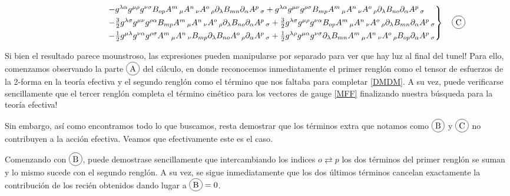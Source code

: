 \documentclass{article}
\numberwithin{equation}{section}
\newcommand*\circled[1]{\tikz[baseline=(char.base)]{ \node[shape=circle,draw,inner sep=2pt] (char) {#1};}} %
\newcommand\f[1]{\mathopen{\hphantom{#1}}} %
\begin{document}
\begin{equation}\label{Hcompact}
\begin{split}
\begin{rcases}
& \f{123456789123}- g^{\lambda \alpha} g^{\mu \rho} g^{\nu \sigma} B_{o p} 	A^{m}\,_{\mu} A^{n}\,_{\nu} A^{o}\,_{\rho} \partial_{\lambda}{B_{m n}} \partial_{\alpha}{A^{p}\,_{\sigma}} + g^{\lambda \alpha} g^{\mu \nu} g^{\rho \sigma} B_{m p} A^{m}\,_{\mu} A^{n}\,_{\nu}  A^{o}\,_{\rho} \partial_{\lambda}{B_{n o}} \partial_{\alpha}{A^{p}\,_{\sigma}} \\
& \f{123456789123} - \frac{3}{2} g^{\lambda \sigma} g^{\mu \nu} g^{\rho \alpha} B_{m p} A^{m}\,_{\mu} A^{n}\,_{\nu} A^{o}\,_{\rho} \partial_{\lambda}{B_{n o}} \partial_{\alpha}{A^{p}\,_{\sigma}} + \frac{3}{2}g^{\lambda \sigma} g^{\mu \rho} g^{\nu \alpha} B_{o p} A^{m}\,_{\mu} A^{n}\,_{\nu} A^{o}\,_{\rho} \partial_{\lambda}{B_{m n}} \partial_{\alpha}{A^{p}\,_{\sigma}}\\
& \f{123456789123} - \frac{1}{2}g^{\mu \lambda} g^{\nu \alpha} g^{\rho \sigma} A^{m}\,_{\mu} A^{n}\,_{\nu} B_{m p} \partial_{\lambda}{B_{n o}} A^{o}\,_{\rho} \partial_{\alpha}{A^{p}\,_{\sigma}} + \frac{1}{2}g^{\lambda \rho} g^{\mu \alpha} g^{\nu \sigma} \partial_{\lambda}{B_{m n}} A^{m}\,_{\mu} A^{n}\,_{\nu} A^{o}\,_{\rho} B_{o p} \partial_{\alpha}{A^{p}\,_{\sigma}}
\end{rcases}
\quad \circled{C}
\end{split}
\end{equation}


Si bien el resultado parece mounstroso, las expresiones pueden manipularse por separado para ver que hay luz al final del tunel! Para ello, comenzamos observando la parte $ \circled{A} $ del cálculo, en donde reconocemos inmediatamente el primer renglón como el tensor de esfuerzos de la 2-forma en la teoría efectiva y el segundo renglón como el término que nos faltaba para completar \ref{DMDM}. A su vez, puede verificarse sencillamente que el tercer renglón completa el término cinético para los vectores de gauge \ref{MFF} finalizando nuestra búsqueda para la teoría efectiva!

Sin embargo, así como encontramos todo lo que buscamos, resta demostrar que los términos extra que notamos como $ \circled{B} $ y $ \circled{C} $ no contribuyen a la acción efectiva. Veamos que efectivamente este es el caso.

Comenzando con $ \circled{B} $, puede demostrase sencillamente que intercambiando los indices $ o \rightleftarrows p$ los dos términos del primer renglón se suman y lo mismo sucede con el segundo renglón. A su vez, se sigue inmediatamente que los dos últimos términos cancelan exactamente la contribución de los recién obtenidos dando lugar a $ \circled{B} = 0 $.
\end{document}
